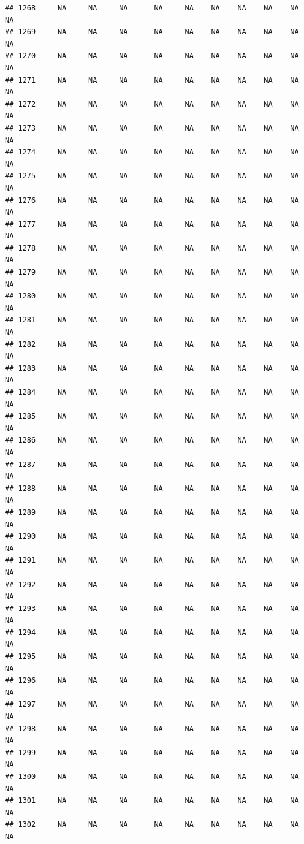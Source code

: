 \documentclass{article}\usepackage{graphicx, color}
\makeatletter
\newenvironment{kframe}{%
 \def\at@end@of@kframe{}%
 \ifinner\ifhmode%
  \def\at@end@of@kframe{\end{minipage}}%
  \begin{minipage}{\columnwidth}%
 \fi\fi%
 \def\FrameCommand##1{\hskip\@totalleftmargin \hskip-\fboxsep
 \colorbox{shadecolor}{##1}\hskip-\fboxsep
     \hskip-\linewidth \hskip-\@totalleftmargin \hskip\columnwidth}%
 \MakeFramed {\advance\hsize-\width
   \@totalleftmargin\z@ \linewidth\hsize
   \@setminipage}}%
 {\par\unskip\endMakeFramed%
 \at@end@of@kframe}
\newenvironment{knitrout}{}{} %
\makeatother
\begin{document}
\begin{knitrout}
\begin{kframe}
\begin{verbatim}
## 1268     NA     NA     NA      NA     NA    NA    NA    NA    NA     NA
## 1269     NA     NA     NA      NA     NA    NA    NA    NA    NA     NA
## 1270     NA     NA     NA      NA     NA    NA    NA    NA    NA     NA
## 1271     NA     NA     NA      NA     NA    NA    NA    NA    NA     NA
## 1272     NA     NA     NA      NA     NA    NA    NA    NA    NA     NA
## 1273     NA     NA     NA      NA     NA    NA    NA    NA    NA     NA
## 1274     NA     NA     NA      NA     NA    NA    NA    NA    NA     NA
## 1275     NA     NA     NA      NA     NA    NA    NA    NA    NA     NA
## 1276     NA     NA     NA      NA     NA    NA    NA    NA    NA     NA
## 1277     NA     NA     NA      NA     NA    NA    NA    NA    NA     NA
## 1278     NA     NA     NA      NA     NA    NA    NA    NA    NA     NA
## 1279     NA     NA     NA      NA     NA    NA    NA    NA    NA     NA
## 1280     NA     NA     NA      NA     NA    NA    NA    NA    NA     NA
## 1281     NA     NA     NA      NA     NA    NA    NA    NA    NA     NA
## 1282     NA     NA     NA      NA     NA    NA    NA    NA    NA     NA
## 1283     NA     NA     NA      NA     NA    NA    NA    NA    NA     NA
## 1284     NA     NA     NA      NA     NA    NA    NA    NA    NA     NA
## 1285     NA     NA     NA      NA     NA    NA    NA    NA    NA     NA
## 1286     NA     NA     NA      NA     NA    NA    NA    NA    NA     NA
## 1287     NA     NA     NA      NA     NA    NA    NA    NA    NA     NA
## 1288     NA     NA     NA      NA     NA    NA    NA    NA    NA     NA
## 1289     NA     NA     NA      NA     NA    NA    NA    NA    NA     NA
## 1290     NA     NA     NA      NA     NA    NA    NA    NA    NA     NA
## 1291     NA     NA     NA      NA     NA    NA    NA    NA    NA     NA
## 1292     NA     NA     NA      NA     NA    NA    NA    NA    NA     NA
## 1293     NA     NA     NA      NA     NA    NA    NA    NA    NA     NA
## 1294     NA     NA     NA      NA     NA    NA    NA    NA    NA     NA
## 1295     NA     NA     NA      NA     NA    NA    NA    NA    NA     NA
## 1296     NA     NA     NA      NA     NA    NA    NA    NA    NA     NA
## 1297     NA     NA     NA      NA     NA    NA    NA    NA    NA     NA
## 1298     NA     NA     NA      NA     NA    NA    NA    NA    NA     NA
## 1299     NA     NA     NA      NA     NA    NA    NA    NA    NA     NA
## 1300     NA     NA     NA      NA     NA    NA    NA    NA    NA     NA
## 1301     NA     NA     NA      NA     NA    NA    NA    NA    NA     NA
## 1302     NA     NA     NA      NA     NA    NA    NA    NA    NA     NA

\end{verbatim}
\end{kframe}
\end{knitrout}
\end{document}
